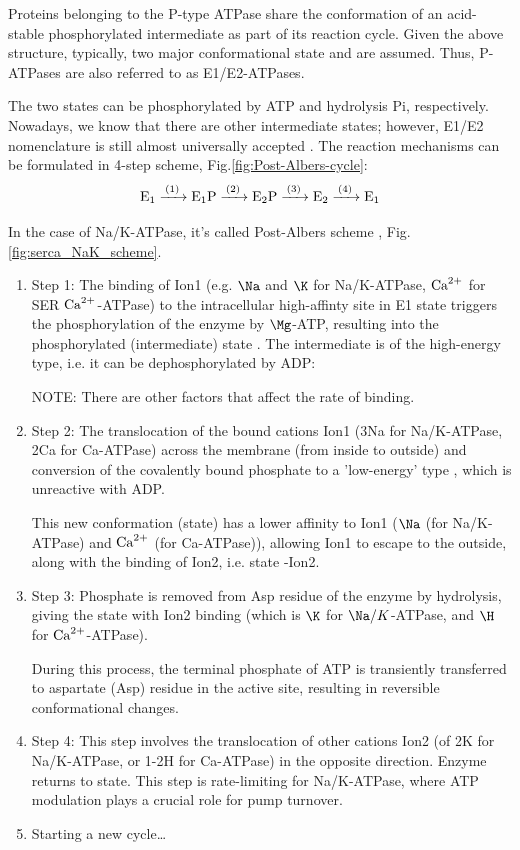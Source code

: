 Proteins belonging to the P-type ATPase share the conformation of an acid-stable
phosphorylated intermediate as part of its reaction cycle.
Given the above structure, typically, two major conformational state  and
 are assumed. Thus, P-ATPases are also referred to as E1/E2-ATPases.

The two states can be phosphorylated by ATP and hydrolysis Pi, respectively.
Nowadays, we know that there are other intermediate states; however, E1/E2
nomenclature is still almost universally accepted \citep{kuhlbrandt2004}. The reaction
mechanisms can be formulated in 4-step scheme, Fig.\ref{fig:Post-Albers-cycle}:
\begin{equation}
\ce{E1 ->[(1)] E1P ->[(2)] E2P ->[(3)] E2 ->[(4)] E1}
\end{equation}

In the case of Na/K-ATPase, it's called Post-Albers scheme \citep{post1972},
Fig.\ref{fig:serca_NaK_scheme}.

\begin{enumerate}

  \item Step 1: The binding of Ion1 (e.g. $\Na$ and $\K$ for Na/K-ATPase, ${\text{Ca}^{2+}}$
  for SER ${\text{Ca}^{2+}}$-ATPase) to the intracellular high-affinty site in E1 state
  triggers the phosphorylation of the enzyme by $\Mg$-ATP, resulting into the
  phosphorylated (intermediate) state . The intermediate  is of
  the high-energy type, i.e. it can be dephosphorylated by ADP:

NOTE: There are other factors that affect the rate of binding.

  \item Step 2: The translocation of the bound cations Ion1 (3Na for
  Na/K-ATPase, 2Ca for Ca-ATPase) across the membrane (from inside to outside)
  and conversion of the covalently bound  phosphate to a 'low-energy' type
  , which is unreactive with ADP. 
  
This new conformation (state) has a lower affinity to Ion1 ($\Na$ (for
Na/K-ATPase) and ${\text{Ca}^{2+}}$ (for Ca-ATPase)), allowing Ion1 to escape to the outside,
along with the binding of Ion2, i.e. state -Ion2.
  
  \item Step 3: Phosphate is removed from Asp residue of the enzyme by
  hydrolysis, giving the state  with Ion2 binding (which is $\K$ for
  $\Na/K$-ATPase, and $\H$ for ${\text{Ca}^{2+}}$-ATPase).
  
During this process, the terminal phosphate of ATP is transiently transferred to
aspartate (Asp) residue in the active site, resulting in reversible
conformational changes.

  \item Step 4: This step involves the translocation of other cations Ion2 (of
  2K for Na/K-ATPase, or 1-2H for Ca-ATPase) in the opposite direction. Enzyme
  returns to  state. This step is rate-limiting for Na/K-ATPase, where
  ATP modulation plays a crucial role for pump turnover.
  
  \item Starting a new cycle\ldots
\end{enumerate}

